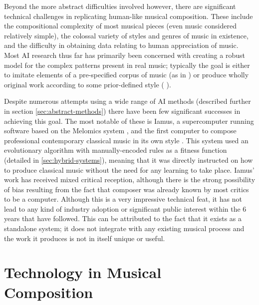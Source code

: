 \documentclass[ author={Stephen Livermore-Tozer},
				supervisor={Dr. Peter Flach},
				degree={MEng},
				title={Performing Algorithmic Co-composition Using Machine Learning},
				subtitle={},
				type={research},
				year={2016} ]{dissertation}
\begin{document}
	Beyond the more abstract difficulties involved however, there are significant technical challenges in replicating human-like musical composition. These include the compositional complexity of most musical pieces (even music considered relatively simple), the colossal variety of styles and genres of music in existence, and the difficulty in obtaining data relating to human appreciation of music. Most AI research thus far has primarily been concerned with creating a robust model for the complex patterns present in real music; typically the goal is either to imitate elements of a pre-specified corpus of music (as in \cite{paiement2007generative} \cite{todd1989connectionist}) or produce wholly original work according to some prior-defined style (\cite{diaz2011composing} \cite{burton1998hybrid} \cite{horowitz1995representing}). 
	
	Despite numerous attempts using a wide range of AI methods (described further in section \ref{sec:abstract-methods}) there have been few significant successes in achieving this goal. The most notable of these is Iamus, a supercomputer running software based on the Melomics system \cite{diaz2011composing}, and the first computer to compose professional contemporary classical music in its own style \cite{scientist2012computer}. This system used an evolutionary algorithm with manually-encoded rules as a fitness function (detailed in \ref{sec:hybrid-systems}), meaning that it was directly instructed on how to produce classical music without the need for any learning to take place. Iamus' work has received mixed critical reception, although there is the strong possibility of bias resulting from the fact that composer was already known by most critics to be a computer. Although this is a very impressive technical feat, it has not lead to any kind of industry adoption or significant public interest within the 6 years that have followed. This can be attributed to the fact that it exists as a standalone system; it does not integrate with any existing musical process and the work it produces is not in itself unique or useful.
	
	\section{Technology in Musical Composition}
	\label{sec:tech-in-music}
	
\end{document}
